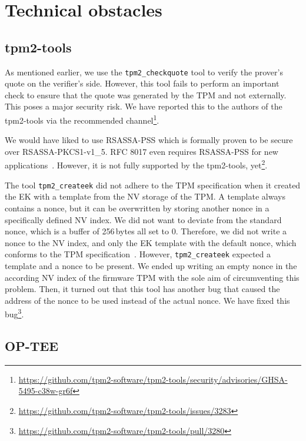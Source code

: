 \section{Technical obstacles}

\subsection{tpm2-tools}

As mentioned earlier, we use the \texttt{tpm2\_checkquote} tool to verify the prover's quote on the verifier's side.
However, this tool fails to perform an important check to ensure that the quote was generated by the TPM and not externally.
This poses a major security risk.
We have reported this to the authors of the tpm2-tools via the recommended channel\footnote{\url{https://github.com/tpm2-software/tpm2-tools/security/advisories/GHSA-5495-c38w-gr6f}}.

We would have liked to use RSASSA-PSS which is formally proven to be secure over RSASSA-PKCS1-v1\_5.
RFC 8017 even requires RSASSA-PSS for new applications~\cite{Moriarty2016}.
However, it is not fully supported by the tpm2-tools, yet\footnote{\url{https://github.com/tpm2-software/tpm2-tools/issues/3283}}.

The tool \texttt{tpm2\_createek} did not adhere to the TPM specification when it created the EK with a template from the NV storage of the TPM\@.
A template always contains a nonce, but it can be overwritten by storing another nonce in a specifically defined NV index.
We did not want to deviate from the standard nonce, which is a buffer of 256\,bytes all set to 0.
Therefore, we did not write a nonce to the NV index, and only the EK template with the default nonce, which conforms to the TPM specification~\cite{tcg-ek}.
However, \texttt{tpm2\_createek} expected a template and a nonce to be present.
We ended up writing an empty nonce in the according NV index of the firmware TPM with the sole aim of circumventing this problem.
Then, it turned out that this tool has another bug that caused the address of the nonce  to be used instead of the actual nonce.
We have fixed this bug\footnote{\url{https://github.com/tpm2-software/tpm2-tools/pull/3280}}.


\subsection{OP-TEE}

